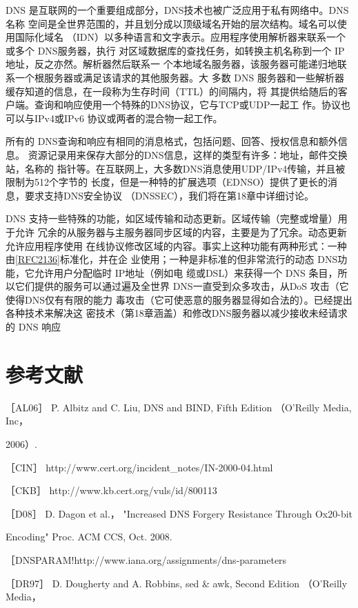 DNS 是互联网的一个重要组成部分，DNS技术也被广泛应用于私有网络中。DNS名称
空间是全世界范围的，并且划分成以顶级域名开始的层次结构。域名可以使用国际化域名
（IDN）以多种语言和文字表示。应用程序使用解析器来联系一个或多个 DNS服务器，执行
对区域数据库的查找任务，如转换主机名称到一个 IP 地址，反之亦然。解析器然后联系一
个本地域名服务器，该服务器可能递归地联系一个根服务器或满足该请求的其他服务器。大
多数 DNS 服务器和一些解析器缓存知道的信息，在一段称为生存时间（TTL）的间隔内，将
其提供给随后的客户端。查询和响应使用一个特殊的DNS协议，它与TCP或UDP一起工
作。协议也可以与IPv4或IPv6 协议或两者的混合物一起工作。

所有的 DNS查询和响应有相同的消息格式，包括问题、回答、授权信息和额外信息。
资源记录用来保存大部分的DNS信息，这样的类型有许多：地址，邮件交换站，名称的
指针等。在互联网上，大多数DNS消息使用UDP/IPv4传输，并且被限制为512个字节的
长度，但是一种特的扩展选项（EDNSO）提供了更长的消息，要求支持DNS安全协议
（DNSSEC），我们将在第18章中详细讨论。

DNS 支持一些特殊的功能，如区域传输和动态更新。区域传输（完整或增量）用于允许
冗余的从服务器与主服务器同步区域的内容，主要是为了冗余。动态更新允许应用程序使用
在线协议修改区域的内容。事实上这种功能有两种形式：一种由\href{https://www.rfc-editor.org/rfc/rfc2136}{[RFC2136]}标准化，并在企
业使用；一种是非标准的但非常流行的动态 DNS功能，它允许用户分配临时 IP地址（例如电
缆或DSL）来获得一个 DNS 条目，所以它们提供的服务可以通过遍及全世界
DNS一直受到众多攻击，从DoS 攻击（它使得DNS仅有有限的能力
毒攻击（它可使恶意的服务器显得如合法的）。已经提出各种技术来解决这
密技术（第18章涵盖）和修改DNS服务器以减少接收未经请求的 DNS 响应

\section{参考文献}

［AL06］ P. Albitz and C. Liu, DNS and BIND, Fifth Edition （O'Reilly Media, Inc，

2006）.

［CIN］ http://www.cert.org/incident\_notes/IN-2000-04.html

［CKB］ http://www.kb.cert.org/vuls/id/800113

［D08］ D. Dagon et al.， "Increased DNS Forgery Resistance Through Ox20-bit

Encoding" Proc. ACM CCS, Oct. 2008.

［DNSPARAM!http://www.iana.org/assignments/dns-parameters

［DR97］ D. Dougherty and A. Robbins, sed \& awk, Second Edition （O'Reilly Media，

